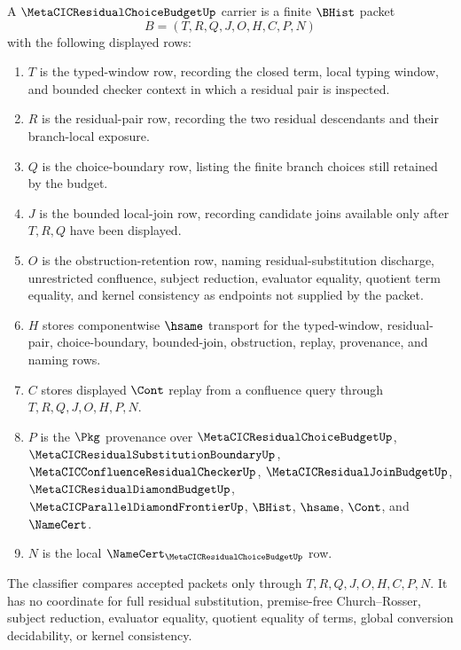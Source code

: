 \begin{definition}
\label{def:metacic-residual-choice-budget-carrier}
A $\MetaCICResidualChoiceBudgetUp$ carrier is a finite $\BHist$ packet
$$
B=(T,R,Q,J,O,H,C,P,N)
$$
with the following displayed rows:
\begin{enumerate}
\item $T$ is the typed-window row, recording the closed term, local typing window, and bounded checker context in which a residual pair is inspected.
\item $R$ is the residual-pair row, recording the two residual descendants and their branch-local exposure.
\item $Q$ is the choice-boundary row, listing the finite branch choices still retained by the budget.
\item $J$ is the bounded local-join row, recording candidate joins available only after $T,R,Q$ have been displayed.
\item $O$ is the obstruction-retention row, naming residual-substitution discharge, unrestricted confluence, subject reduction, evaluator equality, quotient term equality, and kernel consistency as endpoints not supplied by the packet.
\item $H$ stores componentwise $\hsame$ transport for the typed-window, residual-pair, choice-boundary, bounded-join, obstruction, replay, provenance, and naming rows.
\item $C$ stores displayed $\Cont$ replay from a confluence query through $T,R,Q,J,O,H,P,N$.
\item $P$ is the $\Pkg$ provenance over $\MetaCICResidualChoiceBudgetUp$, $\MetaCICResidualSubstitutionBoundaryUp$, $\MetaCICConfluenceResidualCheckerUp$, $\MetaCICResidualJoinBudgetUp$, $\MetaCICResidualDiamondBudgetUp$, $\MetaCICParallelDiamondFrontierUp$, $\BHist$, $\hsame$, $\Cont$, and $\NameCert$.
\item $N$ is the local $\NameCert_{\MetaCICResidualChoiceBudgetUp}$ row.
\end{enumerate}
The classifier compares accepted packets only through $T,R,Q,J,O,H,C,P,N$. It has no coordinate for full residual substitution, premise-free Church--Rosser, subject reduction, evaluator equality, quotient equality of terms, global conversion decidability, or kernel consistency.
\end{definition}

